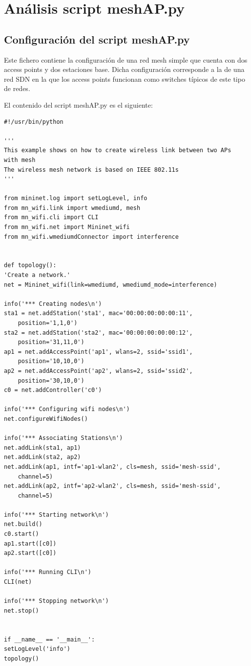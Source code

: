 \documentclass[a4paper,12pt,twoside,spanish]{book}
\begin{document}
	
\chapter{Análisis script meshAP.py}

\section{Configuración del script meshAP.py}

Este fichero contiene la configuración de una red mesh simple que cuenta con dos access points y dos estaciones base. Dicha configuración corresponde a la de una red SDN en la que los access points funcionan como switches típicos de este tipo de redes.\par

El contenido del script meshAP.py es el siguiente: \par

\begin{lstlisting}
#!/usr/bin/python

'''
This example shows on how to create wireless link between two APs 
with mesh
The wireless mesh network is based on IEEE 802.11s
'''

from mininet.log import setLogLevel, info
from mn_wifi.link import wmediumd, mesh
from mn_wifi.cli import CLI
from mn_wifi.net import Mininet_wifi
from mn_wifi.wmediumdConnector import interference


def topology():
'Create a network.'
net = Mininet_wifi(link=wmediumd, wmediumd_mode=interference)

info('*** Creating nodes\n')
sta1 = net.addStation('sta1', mac='00:00:00:00:00:11', 
	position='1,1,0')
sta2 = net.addStation('sta2', mac='00:00:00:00:00:12', 
	position='31,11,0')
ap1 = net.addAccessPoint('ap1', wlans=2, ssid='ssid1', 
	position='10,10,0')
ap2 = net.addAccessPoint('ap2', wlans=2, ssid='ssid2', 
	position='30,10,0')
c0 = net.addController('c0')

info('*** Configuring wifi nodes\n')
net.configureWifiNodes()

info('*** Associating Stations\n')
net.addLink(sta1, ap1)
net.addLink(sta2, ap2)
net.addLink(ap1, intf='ap1-wlan2', cls=mesh, ssid='mesh-ssid', 
	channel=5)
net.addLink(ap2, intf='ap2-wlan2', cls=mesh, ssid='mesh-ssid', 
	channel=5)

info('*** Starting network\n')
net.build()
c0.start()
ap1.start([c0])
ap2.start([c0])

info('*** Running CLI\n')
CLI(net)

info('*** Stopping network\n')
net.stop()


if __name__ == '__main__':
setLogLevel('info')
topology()
\end{lstlisting}
\end{document}
